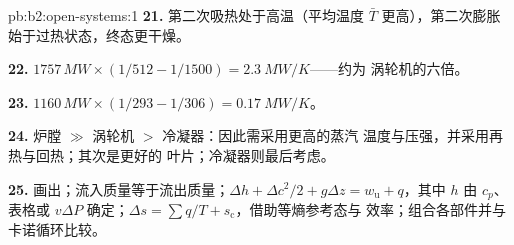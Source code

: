 \begin{solution}{pb:b2:open-systems:1}
\textbf{21.} 第二次吸热处于高温（平均温度
$\bar T$ 更高），第二次膨胀始于过热状态，终态更干燥。

\textbf{22.} $1757\,\unit{MW} \times (1/512 - 1/1500) = \qty{2.3}{MW/K}$——约为
涡轮机的六倍。

\textbf{23.} $1160\,\unit{MW} \times (1/293 - 1/306) = \qty{0.17}{MW/K}$。

\textbf{24.} 炉膛 $\gg$ 涡轮机 $>$ 冷凝器：因此需采用更高的蒸汽
温度与压强，并采用再热与回热；其次是更好的
叶片；冷凝器则最后考虑。

\textbf{25.} 画出；流入质量等于流出质量；$\Delta h +
\Delta c^2/2 + g\Delta z = w_{\text{u}} + q$，其中 $h$ 由 $c_p$、
表格或 $v\Delta P$ 确定；$\Delta s = \sum q/T + s_{\text{c}}$，借助等熵参考态与
效率；组合各部件并与卡诺循环比较。
\end{solution}
